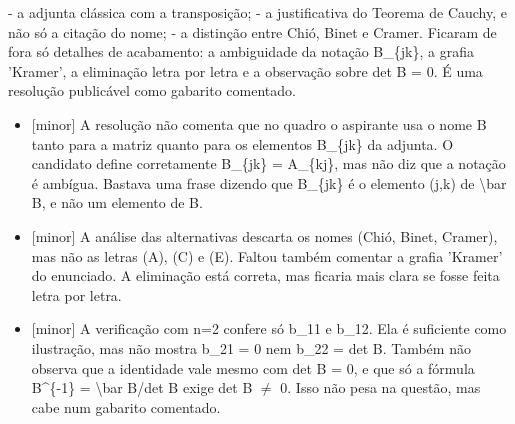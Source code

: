 \documentclass{article}%
\begin{document}
{-} a adjunta clássica com a transposição;\newline%
{-} a justificativa do Teorema de Cauchy, e não só a citação do nome;\newline%
{-} a distinção entre Chió, Binet e Cramer.\newline%
\newline%
Ficaram de fora só detalhes de acabamento: a ambiguidade da notação B\_\{jk\}, a grafia 'Kramer', a eliminação letra por letra e a observação sobre det B = 0. É uma resolução publicável como gabarito comentado.%
\begin{itemize}%
\item%
{[}minor{]} A resolução não comenta que no quadro o aspirante usa o nome B tanto para a matriz quanto para os elementos B\_\{jk\} da adjunta. O candidato define corretamente B\_\{jk\} = A\_\{kj\}, mas não diz que a notação é ambígua. Bastava uma frase dizendo que B\_\{jk\} é o elemento (j,k) de \textbackslash{}bar B, e não um elemento de B.%
\item%
{[}minor{]} A análise das alternativas descarta os nomes (Chió, Binet, Cramer), mas não as letras (A), (C) e (E). Faltou também comentar a grafia 'Kramer' do enunciado. A eliminação está correta, mas ficaria mais clara se fosse feita letra por letra.%
\item%
{[}minor{]} A verificação com n=2 confere só b\_11 e b\_12. Ela é suficiente como ilustração, mas não mostra b\_21 = 0 nem b\_22 = det B. Também não observa que a identidade vale mesmo com det B = 0, e que só a fórmula B\^{}\{{-}1\} = \textbackslash{}bar B/det B exige det B $\neq$ 0. Isso não pesa na questão, mas cabe num gabarito comentado.%
\end{itemize}%
\end{document}
